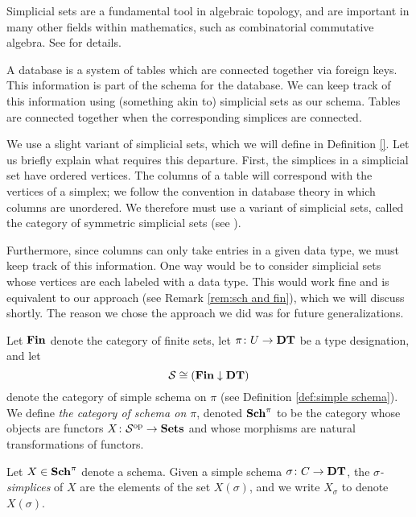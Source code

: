 \documentclass{amsart}
\def\DT{{\bf DT}}
\def\Sch{{\bf Sch}}
\def\Fin{{\bf Fin}}
\begin{document}
Simplicial sets are a fundamental tool in algebraic topology, and are important in many other fields within mathematics, such as combinatorial commutative algebra.   See \cite{} for details.

A database is a system of tables which are connected together via foreign keys.  This information is part of the schema for the database.  We can keep track of this information using (something akin to) simplicial sets as our schema.  Tables are connected together when the corresponding simplices are connected.  

We use a slight variant of simplicial sets, which we will define in Definition \ref{}.  Let us briefly explain what requires this departure.  First, the simplices in a simplicial set have ordered vertices.  The columns of a table will correspond with the vertices of a simplex; we follow the convention in database theory in which columns are unordered.  We therefore must use a variant of simplicial sets, called the category of symmetric simplicial sets (see \cite{Grandis?}).

Furthermore, since columns can only take entries in a given data type, we must keep track of this information.  One way would be to consider simplicial sets whose vertices are each labeled with a data type.  This would work fine and is equivalent to our approach (see Remark \ref{rem:sch and fin}), which we will discuss shortly.  The reason we chose the approach we did was for future generalizations.

\begin{definition}\label{def:schema}

Let $\Fin$ denote the category of finite sets, let $\pi\taking U\to\DT$ be a type designation, and let $$\mcS\iso(\Fin\down\DT)$$ denote the category of simple schema on $\pi$ (see Definition \ref{def:simple schema}).  We define {\em the category of schema on $\pi$}, denoted $\Sch^\pi$ to be the category whose objects are functors $X\colon\mathcal{S}^\textnormal{op}\rightarrow{\bf Sets}$ and whose morphisms are natural transformations of functors.

Let $X\in\Sch^\pi$ denote a schema.  Given a simple schema $\sigma\taking C\to\DT$, the {\em $\sigma$-simplices} of $X$ are the elements of the set $X(\sigma)$, and we write $X_\sigma$ to denote $X(\sigma)$.

\end{definition}
\end{document}
